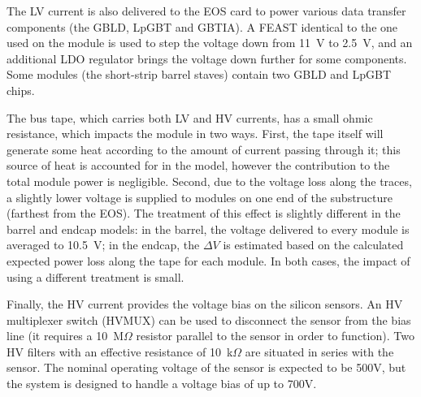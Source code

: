 The LV current is also delivered to the EOS card to power various data transfer components
(the GBLD, LpGBT and GBTIA). A FEAST identical to the one used on the module is used to step the
voltage down from 11~V to 2.5~V, and an additional LDO regulator brings the voltage down further for some components.
Some modules (the short-strip barrel staves) contain two GBLD and LpGBT chips.

The bus tape, which carries both LV and HV currents, has a small ohmic resistance, which impacts the
module in two ways. First,
the tape itself will generate some heat according to the amount of current passing through it; this
source of heat is accounted for in the model, however the contribution to the total module power
is negligible.
Second, due to the voltage loss along the traces, a slightly lower voltage is supplied to modules on one end of the substructure (farthest from the EOS).
The treatment of this effect is slightly different in the barrel and
endcap models: in the barrel, the voltage delivered to every module is averaged to 10.5~V; in the endcap,
the $\Delta V$ is estimated based on the calculated expected power loss along the tape for each module.
In both cases, the impact of using a different treatment is small.

Finally, the HV current provides the voltage bias on the silicon sensors. An HV multiplexer
switch (HVMUX) can be used to disconnect the sensor from the
bias line (it requires a 10~M$\Omega$ resistor parallel to the sensor in order to function). Two HV filters with an effective resistance of 10~k$\Omega$ are situated in series with the
sensor. The nominal operating voltage of the sensor is expected to be 500V, but the system is designed
to handle a voltage bias of up to 700V.
